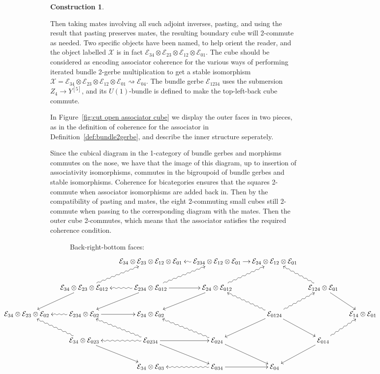 \documentclass[12pt]{amsart}
\theoremstyle{plain}
\theoremstyle{definition}
\newtheorem{construction}[theorem]{Construction}
\theoremstyle{remark}
\numberwithin{equation}{section}
\newcommand{\cE}{{\mathcal E}}
\newcommand{\<}{\langle}
\renewcommand{\>}{\rangle}
\begin{document}
\begin{construction}
\begin{enumerate}
Then taking mates involving all such adjoint inverses, pasting, and using the result that pasting preserves mates, the resulting boundary cube will 2-commute as needed.
Two specific objects have been named, to help orient the reader, and the object labelled $\mathcal{X}$ is in fact $\cE_{34}\otimes\cE_{23}\otimes\cE_{12}\otimes \cE_{01}$. The cube should be considered as encoding associator coherence for the various ways of performing iterated bundle 2-gerbe multiplication to get a stable isomorphism $\mathcal{X} = \cE_{34}\otimes\cE_{23}\otimes\cE_{12}\otimes \cE_{01} \rightsquigarrow \cE_{04}$.
The bundle gerbe $\cE_{1234}$ uses the submersion $Z_4\to Y^{[5]}$, and its $U(1)$-bundle is defined to make the top-left-back cube commute.

In Figure~\ref{fig:cut open associator cube} we display the outer faces in two pieces, as in the definition of coherence for the associator in Definition~\ref{def:bundle2gerbe}, and describe the inner structure seperately. 

Since the cubical diagram in the 1-category of bundle gerbes and morphisms commutes on the nose, we have that the image of this diagram, up to insertion of associativity isomorphisms, commutes in the bigroupoid of bundle gerbes and stable isomorphisms. Coherence for bicategories ensures that the squares 2-commute when associator isomorphisms are added back in.
Then by the compatibility of pasting and mates, the eight 2-commuting small cubes still 2-commute when passing to the corresponding diagram with the mates.
Then the outer cube 2-commutes, which means that the associator satisfies the required coherence condition.

\begin{figure}
\noindent Back-right-bottom faces:
{\scriptsize
\[
	\centerline{
	\xymatrix@C=1em{
		&& \cE_{34}\otimes\cE_{23}\otimes\cE_{12}\otimes \cE_{01}  & \ar@{~>}[l] \cE_{234}\otimes\cE_{12}\otimes \cE_{01} \ar[r] & \cE_{24}\otimes\cE_{12}\otimes \cE_{01} \\
		& \ar[dl] \cE_{34}\otimes \cE_{23}\otimes \cE_{012} \ar@{~>}[ur] & \ar@{~>}[l] \ar[dl] \ar@{~>}[ur] \ar[r] \cE_{234}\otimes \cE_{012} & \ar[dl] \ar@{~>}[ur] \cE_{24}\otimes \cE_{012}  && \ar@{~>}[ul] \cE_{124}\otimes \cE_{01} \ar[dr]\\
		\cE_{34}\otimes\cE_{23}\otimes \cE_{02} & \ar@{~>}[l]  \cE_{234}\otimes\cE_{02} \ar[r]  & \cE_{24}\otimes\cE_{02} && \ar@{~>}[ul] \ar[dl] \cE_{0124} \ar@{~>}[ur] \ar[dr] && \cE_{14}\otimes \cE_{01}\\
		& \ar@{~>}[ul] \cE_{34}\otimes\cE_{023} \ar[dr] &\ar@{~>}[l] \ar@{~>}[ul] \cE_{0234} \ar[r] \ar[dr] & \ar@{~>}[ul] \cE_{024} \ar[dr] && \ar[dl] \cE_{014} \ar@{~>}[ur]\\
		&& \cE_{34}\otimes\cE_{03} & \ar@{~>}[l] \cE_{034} \ar[r] & \cE_{04} 
	}
	}
\]}


\end{figure}
\end{enumerate}
\end{construction}
\end{document}
